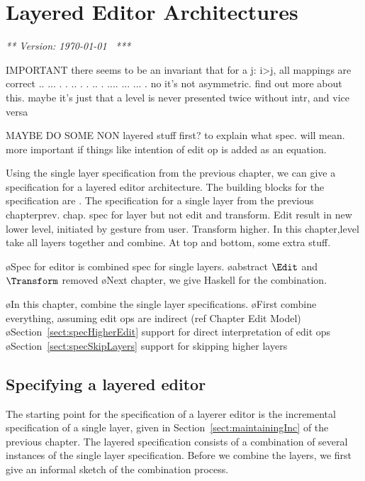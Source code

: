 \chapter{Layered Editor Architectures}
\label{chap:layeredArchs}
{\em *** Version: \today~ ***}


\bc

IMPORTANT there seems to be an invariant that for a j:  i>j, all mappings are correct 
  ..           ...       
 .  .    ..   .   .   .. 
.    ....  ...     ...  .
no it's not asymmetric. find out more about this.
maybe it's just that a level is never presented twice without intr, and vice versa


MAYBE DO SOME NON layered stuff first? to explain what spec. will mean. more important if things like intention of edit op is added as an equation.
\ec


\bc
Using the single layer specification from the previous chapter, we can give a specification for a layered editor architecture. The building blocks for the specification are . The specification for a single layer from the previous chapterprev. chap. spec for layer but not edit and transform. Edit result in new lower level, initiated by gesture from user. Transform higher. In this chapter,level take all layers together and combine. At top and bottom, some extra stuff.
\ec

\bl
\o Spec for editor is combined spec for single layers.
\o abstract $\Edit$ and $\Transform$ removed
\o Next chapter, we give Haskell for the combination.
\el

\bl
\o In this chapter, combine the single layer specifications.
\o First combine everything, assuming edit ops are indirect (ref Chapter Edit Model)
\o Section~\ref{sect:specHigherEdit} support for direct interpretation of edit ops
\o Section~\ref{sect:specSkipLayers} support for skipping higher layers
\el

\fromHere  %

\section{Specifying a layered editor}\label{sect:specCombination}

The starting point for the specification of a layerer editor is the incremental specification of a single layer, given in Section~\ref{sect:maintainingInc} of the previous chapter. The layered specification consists of a combination of several instances of the single layer specification. Before we combine the layers, we first give an informal sketch of the combination process.

